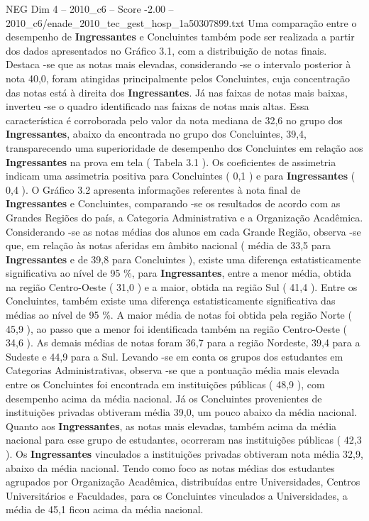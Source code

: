 \begin{textsample}{NEG Dim 4 – 2010\_c6 – Score -2.00 – 2010\_c6/enade\_2010\_tec\_gest\_hosp\_1a50307899.txt}
Uma comparação entre o desempenho de \textbf{Ingressantes} e Concluintes também pode ser realizada a partir dos dados apresentados no Gráfico 3.1, com a distribuição de notas finais.
Destaca -se que as notas mais elevadas, considerando -se o intervalo posterior à nota 40,0, foram atingidas principalmente pelos Concluintes, cuja concentração das notas está à direita dos \textbf{Ingressantes}.
Já nas faixas de notas mais baixas, inverteu -se o quadro identificado nas faixas de notas mais altas.
Essa característica é corroborada pelo valor da nota mediana de 32,6 no grupo dos \textbf{Ingressantes}, abaixo da encontrada no grupo dos Concluintes, 39,4, transparecendo uma superioridade de desempenho dos Concluintes em relação aos \textbf{Ingressantes} na prova em tela ( Tabela 3.1 ).
Os coeficientes de assimetria indicam uma assimetria positiva para Concluintes ( 0,1 ) e para \textbf{Ingressantes} ( 0,4 ).
O Gráfico 3.2 apresenta informações referentes à nota final de \textbf{Ingressantes} e Concluintes, comparando -se os resultados de acordo com as Grandes Regiões do país, a Categoria Administrativa e a Organização Acadêmica.
Considerando -se as notas médias dos alunos em cada Grande Região, observa -se que, em relação às notas aferidas em âmbito nacional ( média de 33,5 para \textbf{Ingressantes} e de 39,8 para Concluintes ), existe uma diferença estatisticamente significativa ao nível de 95 \%, para \textbf{Ingressantes}, entre a menor média, obtida na região Centro-Oeste ( 31,0 ) e a maior, obtida na região Sul ( 41,4 ).
Entre os Concluintes, também existe uma diferença estatisticamente significativa das médias ao nível de 95 \%.
A maior média de notas foi obtida pela região Norte ( 45,9 ), ao passo que a menor foi identificada também na região Centro-Oeste ( 34,6 ).
As demais médias de notas foram 36,7 para a região Nordeste, 39,4 para a Sudeste e 44,9 para a Sul.
Levando -se em conta os grupos dos estudantes em Categorias Administrativas, observa -se que a pontuação média mais elevada entre os Concluintes foi encontrada em instituições públicas ( 48,9 ), com desempenho acima da média nacional.
Já os Concluintes provenientes de instituições privadas obtiveram média 39,0, um pouco abaixo da média nacional.
Quanto aos \textbf{Ingressantes}, as notas mais elevadas, também acima da média nacional para esse grupo de estudantes, ocorreram nas instituições públicas ( 42,3 ).
Os \textbf{Ingressantes} vinculados a instituições privadas obtiveram nota média 32,9, abaixo da média nacional.
Tendo como foco as notas médias dos estudantes agrupados por Organização Acadêmica, distribuídas entre Universidades, Centros Universitários e Faculdades, para os Concluintes vinculados a Universidades, a média de 45,1 ficou acima da média nacional.

\end{textsample}
